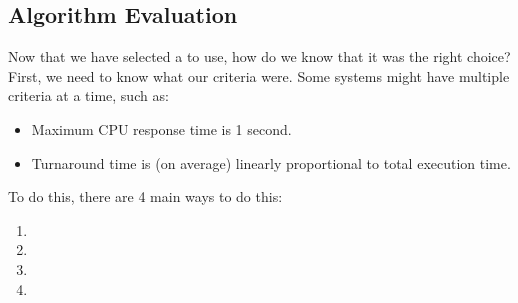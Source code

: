 \subsection{Algorithm Evaluation}\label{subsec:Algorithm_Evaluation}
Now that we have selected a  to use, how do we know that it was the right choice?
First, we need to know what our criteria were.
Some systems might have multiple criteria at a time, such as:
\begin{itemize}[noitemsep]
\item Maximum CPU response time is 1 second.
\item Turnaround time is (on average) linearly proportional to total execution time.
\end{itemize}

To do this, there are 4 main ways to do this:
\begin{enumerate}[noitemsep]
\item {}
\item {}
\item {}
\item {}
\end{enumerate}


